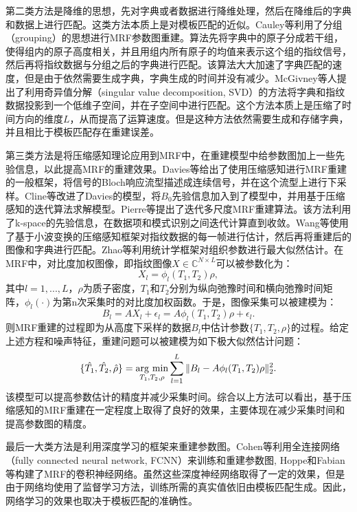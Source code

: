 第二类方法是降维的思想，先对字典或者数据进行降维处理，然后在降维后的字典和数据上进行匹配。这类方法本质上是对模板匹配的近似。Cauley\cite{groupingmrf}等利用了分组（grouping）的思想进行MRF参数图重建。算法先将字典中的原子分成若干组，使得组内的原子高度相关，并且用组内所有原子的均值来表示这个组的指纹信号，然后再将指纹数据与分组之后的字典进行匹配。该算法大大加速了字典匹配的速度，但是由于依然需要生成字典，字典生成的时间并没有减少。McGivney\cite{svdmrf}等人提出了利用奇异值分解（singular value decomposition, SVD）的方法将字典和指纹数据投影到一个低维子空间，并在子空间中进行匹配。这个方法本质上是压缩了时间方向的维度$L$，从而提高了运算速度。但是这种方法依然需要生成和存储字典，并且相比于模板匹配存在重建误差。

第三类方法是将压缩感知理论应用到MRF中，在重建模型中给参数图加上一些先验信息，以此提高MRF的重建效果。Davies\cite{davies2014compressed}等给出了使用压缩感知进行MRF重建的一般框架，将信号的Bloch响应流型描述成连续信号，并在这个流型上进行下采样。Cline\cite{cline2017air}等改进了Davies的模型，将$B_0$先验信息加入到了模型中，并用基于压缩感知的迭代算法求解模型。Pierre\cite{multiscale}等提出了迭代多尺度MRF重建算法。该方法利用了k-space的先验信息，在数据项和模式识别之间迭代计算直到收敛。Wang\cite{wang2016magnetic}等使用了基于小波变换的压缩感知框架对指纹数据的每一帧进行估计，然后再将重建后的图像和字典进行匹配。Zhao等\cite{zhao2016maximum}利用统计学框架对组织参数进行最大似然估计。在MRF中，对比度加权图像，即指纹图像$X\in \mathbb{C}^{N\times L}$可以被参数化为：
\begin{equation}
	X_l=\phi_l(T_1,T_2)\rho,
\end{equation}
其中$l=1,...,L$，$\rho$为质子密度，$T_1$和$T_2$分别为纵向弛豫时间和横向弛豫时间矩阵，$\phi_l(\cdot)$为第n次采集时的对比度加权函数。于是，图像采集可以被建模为：
\begin{equation}
	B_l=AX_l+\epsilon_l=A\phi_l(T_1,T_2)\rho+\epsilon_l.
\end{equation}
则MRF重建的过程即为从高度下采样的数据$B_l$中估计参数$\{T_1,T_2,\rho\}$的过程。给定上述方程和噪声特征，重建问题可以被建模为如下极大似然估计问题：
\begin{equation}
	\{\hat{T_1},\hat{T_2},\hat{\rho}\}=\argmin_{T_1,T_2,\rho}\sum_{l=1}^L\|B_l-A\phi_l(T_1,T_2)\rho\|_2^2.
\end{equation}
该模型可以提高参数估计的精度并减少采集时间。综合以上方法可以看出，基于压缩感知的MRF重建在一定程度上取得了良好的效果，主要体现在减少采集时间和提高参数图的精度。

最后一大类方法是利用深度学习的框架来重建参数图。Cohen\cite{cohen2018mr}等利用全连接网络（fully connected neural network, FCNN）来训练和重建参数图, Hoppe\cite{hoppe2017deep}和Fabian\cite{balsiger2018magnetic}等构建了MRF的卷积神经网络。虽然这些深度神经网络取得了一定的效果，但是由于网络均使用了监督学习方法，训练所需的真实值依旧由模板匹配生成。因此，网络学习的效果也取决于模板匹配的准确性。

